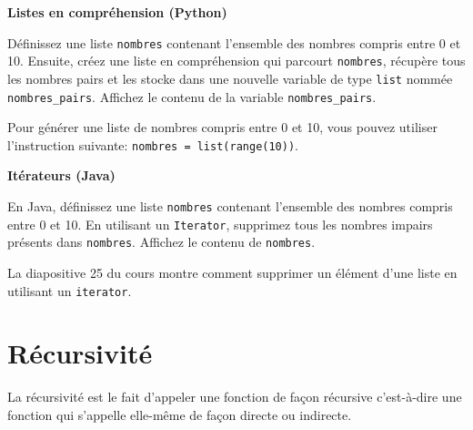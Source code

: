 \begin{Exercice}[5 minutes] \textbf{Listes en compréhension (Python)}

    Définissez une liste \lstinline{nombres} contenant l'ensemble des nombres compris entre 0 et 10. Ensuite, créez une liste en compréhension qui parcourt \lstinline{nombres}, récupère tous les nombres pairs et les stocke dans une nouvelle variable de type \lstinline{list} nommée \lstinline{nombres_pairs}. Affichez le contenu de la variable \lstinline{nombres_pairs}.

    \begin{conseil}
        Pour générer une liste de nombres compris entre 0 et 10, vous pouvez utiliser l'instruction suivante: \lstinline{nombres = list(range(10))}.
    \end{conseil}

    \begin{solution}
        
    \end{solution}
\end{Exercice}

\begin{Exercice}[10 minutes] \textbf{Itérateurs (Java)}

    En Java, définissez une liste \lstinline{nombres} contenant l'ensemble des nombres compris entre 0 et 10. 
    En utilisant un \lstinline{Iterator}, supprimez tous les nombres impairs présents dans \lstinline{nombres}.
    Affichez le contenu de \lstinline{nombres}.

    \begin{conseil}
        La diapositive 25 du cours montre comment supprimer un élément d'une liste en utilisant un \lstinline{iterator}.
    \end{conseil}

    \begin{solution}
        
    \end{solution}
\end{Exercice}

     \section{Récursivité}
    
    La récursivité est le fait d'appeler une fonction de façon récursive c'est-à-dire une fonction qui s'appelle elle-même de façon directe ou indirecte. \\\\
    

